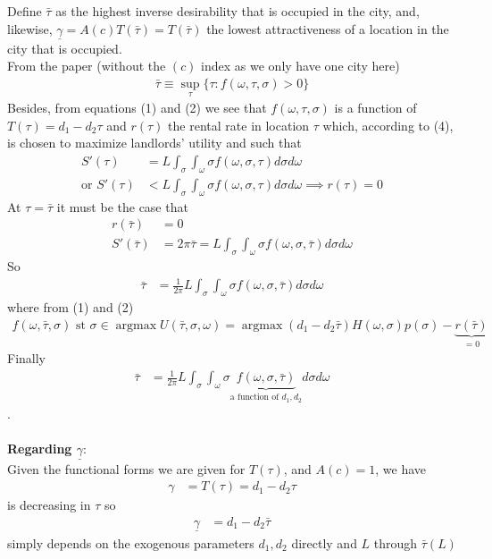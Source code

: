 \documentclass[10pt, final]{article}
\DeclareMathOperator{\argmax}{argmax}
\begin{document}
\begin{enumerate}[1.]
{   Define $\bar{\tau}$ as the highest inverse desirability that is occupied in the city, and, likewise, $\underline{\gamma} = A(c) T(\bar{\tau}) = T(\bar{\tau})$ the lowest attractiveness of a location in the city that is occupied.
    \\
    From the paper (without the $(c)$ index as we only have one city here)
    \begin{align*}
        \bar{\tau} \equiv \sup_{\tau}\{\tau : f(\omega, \tau, \sigma) > 0\}
    \end{align*}
    Besides, from equations (1) and (2) we see that $f(\omega, \tau, \sigma)$ is a function of $T(\tau) = d_1 - d_2 \tau$ and $r(\tau)$ the rental rate in location $\tau$ which, according to (4), is chosen to maximize landlords' utility and such that 
    \begin{align*}
        S'(\tau) &=  L \int_\sigma \int_\omega \sigma f(\omega, \sigma, \tau) d \sigma d\omega \\
        \text{or } S'(\tau) &<  L \int_\sigma \int_\omega \sigma f(\omega, \sigma, \tau) d \sigma d\omega \implies r(\tau) = 0
    \end{align*}
    At $\tau = \bar{\tau}$ it must be the case that 
    \begin{align*}
        r(\bar{\tau}) &= 0 \\
        S'(\bar{\tau}) &= 2 \pi \bar{\tau} = L \int_\sigma \int_\omega \sigma f(\omega, \sigma, \bar{\tau}) d \sigma d\omega 
    \end{align*}
    So
    \begin{align*}
        \bar{\tau} &= \frac{1}{2 \pi } L \int_\sigma \int_\omega \sigma f(\omega, \sigma, \bar{\tau}) d \sigma d\omega 
    \end{align*}
    where from (1) and (2)
    \begin{align*}
        f(\omega, \bar{\tau}, \sigma) \text{ st } \sigma \in \argmax U(\bar{\tau}, \sigma, \omega) = \argmax (d_1 - d_2 \bar{\tau}) H(\omega, \sigma) p(\sigma) - \underbrace{r(\bar{\tau})}_{= 0}
    \end{align*}
    Finally
    \begin{align*}
        \bar{\tau} &= \frac{1}{2 \pi } L \int_\sigma \int_\omega \sigma \underbrace{f(\omega, \sigma, \bar{\tau})}_{\text{a function of } d_1, d_2} d \sigma d\omega 
    \end{align*}
}.
    \\
    \\
    \textbf{Regarding $\underline{\gamma}$}:
    \\
    Given the functional forms we are given for $T(\tau)$, and $A(c) = 1$, we have
    \begin{align*}
        \gamma &= T(\tau) = d_1 - d_2 \tau
    \end{align*}
    is decreasing in $\tau$ so
    \begin{align*}
        \underline{\gamma} &= d_1 - d_2 \bar{\tau}
    \end{align*}
    simply depends on the exogenous parameters $d_1, d_2$ directly and $L$ through $\bar{\tau}(L)$
 



\end{enumerate}
\end{document}
